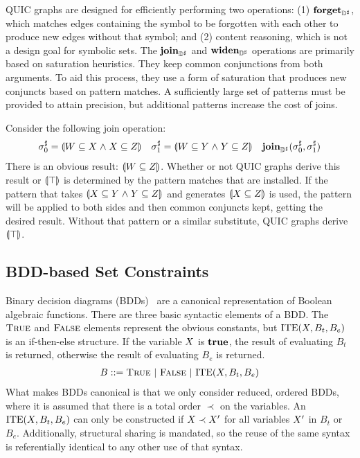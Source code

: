 QUIC graphs are designed for efficiently performing two operations:
(1) $\textbf{forget}_{{\mathbb{D}}^{\sharp}}$, which matches edges containing the symbol to be
forgotten with each other to produce new edges without that symbol; and
(2) content reasoning, which is not a design goal for symbolic sets.
The $\textbf{join}_{{\mathbb{D}}^{\sharp}}$ and $\textbf{widen}_{{\mathbb{D}}^{\sharp}}$ operations are primarily based on
saturation heuristics.
They keep common conjunctions from both arguments.
To aid this process, they use a form of saturation that produces new
conjuncts based on pattern matches.
A sufficiently large set of patterns must be provided to attain precision,
but additional patterns increase the cost of joins.
\begin{example} \label{ex:Qjoin}  Consider the following join operation:
    \begin{align*}
      {\sigma}^{\sharp}_0 &= \llparenthesis W \subseteq X \mathrel{\wedge} X \subseteq Z \rrparenthesis &
      {\sigma}^{\sharp}_1 &= \llparenthesis W \subseteq Y \mathrel{\wedge} Y \subseteq Z \rrparenthesis &
      \textbf{join}_{{\mathbb{D}}^{\sharp}}({\sigma}^{\sharp}_0, {\sigma}^{\sharp}_1 )
    \end{align*}
    There is an obvious result: $\llparenthesis W \subseteq Z \rrparenthesis$.  Whether or not QUIC graphs derive this result or $\llparenthesis \top \rrparenthesis$ is determined by the pattern matches that are installed.  If the pattern that takes $\llparenthesis X \subseteq Y \mathrel{\wedge} Y \subseteq Z \rrparenthesis$ and generates $\llparenthesis X \subseteq Z \rrparenthesis$ is used, the pattern will be applied to both sides and then common conjuncts kept, getting the desired result.  Without that pattern or a similar substitute, QUIC graphs derive $\llparenthesis \top \rrparenthesis$.
\end{example}

\subsection{BDD-based Set Constraints}
\label{s:4:3:bdd}
Binary decision diagrams (BDDs)~\cite{bdd:csd:99} are a canonical representation of Boolean algebraic functions.  There are three basic syntactic elements of a BDD.  The $\textsc{True}$ and $\textsc{False}$ elements represent the obvious constants, but $\textrm{ITE}(X,B_t,B_e)$ is an if-then-else structure.  If the variable $X$ is $\mathbf{true}$, the result of evaluating $B_t$ is returned, otherwise the result of evaluating $B_e$ is returned.
\begin{align*}
  B ::= \textsc{True} \ | \ \textsc{False} \ | \ \textrm{ITE}(\setvx,B_t,B_e)
\end{align*}
What makes BDDs canonical is that we only consider reduced, ordered BDDs, where it is assumed that there is a total order $\prec$ on the variables.  An $\textrm{ITE}(X,B_t,B_e)$ can only be constructed if $X \prec X'$ for all variables $X'$ in $B_t$ or $B_e$.  Additionally, structural sharing is mandated, so the reuse of the same syntax is referentially identical to any other use of that syntax.

